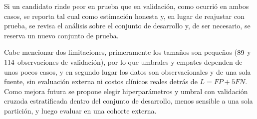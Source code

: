\begin{enumerate}
Si un candidato rinde peor en prueba que en validación, como ocurrió en ambos
casos, se reporta tal cual como estimación honesta y, en lugar de reajustar
con prueba, se revisa el análisis sobre el conjunto de desarrollo y, de ser
necesario, se reserva un nuevo conjunto de prueba.

Cabe mencionar dos limitaciones, primeramente los tamaños son pequeños
($89$ y $114$ observaciones de validación), por lo que umbrales y
empates dependen de unos pocos casos, y en segundo lugar los datos son
observacionales y de una sola fuente, sin evaluación externa ni costos
clínicos reales detrás de $L=FP+5FN$. Como mejora futura se propone elegir
hiperparámetros y umbral con validación cruzada estratificada dentro del
conjunto de desarrollo, menos sensible a una sola partición, y luego evaluar
en una cohorte externa.

\end{enumerate}
